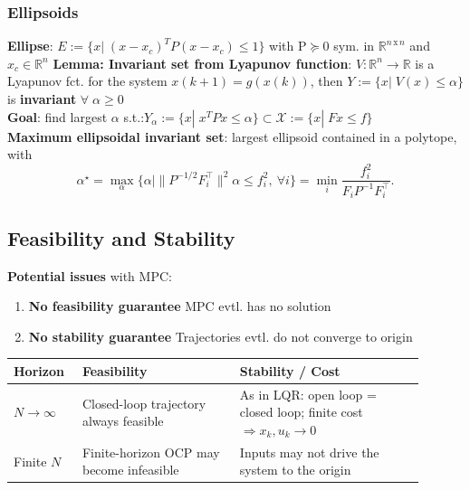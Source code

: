 \subsubsection{Ellipsoids}
\textbf{Ellipse}: $E:=\{x|\;(x-x_c)^TP(x-x_c)\leq1\}$ with P$\succeq0$ sym. in $\mathbb{R}^{n\,\text{x}\,n}$ and $x_c\in \mathbb{R}^n$
\textbf{Lemma: Invariant set from Lyapunov function}: $V:\mathbb{R}^n\rightarrow\mathbb{R}$ is a Lyapunov fct. for the system $x(k+1)=g(x(k))$, then $Y:=\{x|\;V(x)\leq \alpha\}$ is \textbf{invariant} $\forall\;\alpha\geq0$\\
\textbf{Goal}: find largest $\alpha$ s.t.:$Y_\alpha:=\{x|\;x^TPx\leq \alpha\}\subset\mathcal{X}:=\{x|\;Fx\leq f\}$\\

\textbf{Maximum ellipsoidal invariant set}: largest ellipsoid contained in a polytope, with
\[
\alpha^\star=\max_\alpha\{\alpha\mid \|P^{-1/2}F_i^\top\|^2\alpha\le f_i^2,\ \forall i\}=\min_i\frac{f_i^2}{F_iP^{-1}F_i^\top}.
\]


\subsection{Feasibility and Stability}
\textbf{Potential issues} with MPC:
\begin{enumerate}
    \item \textbf{No feasibility guarantee} \rightarrow MPC evtl. has no solution
    \item \textbf{No stability guarantee} \rightarrow Trajectories evtl. do not converge to origin
\end{enumerate}

\begin{center}
\scriptsize
\setlength{\tabcolsep}{5pt}
\renewcommand{\arraystretch}{1.15}
\begin{tabular}{|
>{\centering\arraybackslash}m{0.14\linewidth}|
>{\centering\arraybackslash}m{0.35\linewidth}|
>{\centering\arraybackslash}m{0.41\linewidth}|}
\hline
\textbf{Horizon} & \textbf{Feasibility} & \textbf{Stability / Cost} \\ \hline
$N\to\infty$
& Closed-loop trajectory always feasible
& As in LQR: open loop = closed loop; finite cost
  $\Rightarrow x_k,u_k\to0$ \\ \hline
Finite $N$
& Finite-horizon OCP may become infeasible
& Inputs may not drive the system to the origin \\ \hline
\end{tabular}
\end{center}

